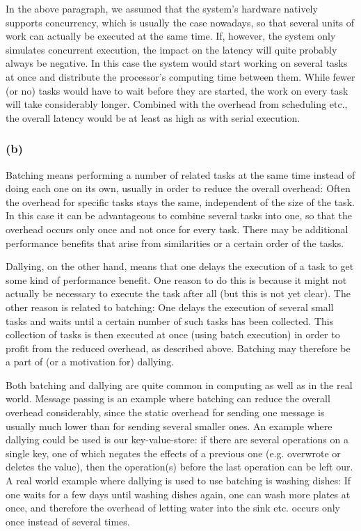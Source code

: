 \documentclass[12pt,a4paper]{article}
\begin{document}
In the above paragraph, we assumed that the system's hardware natively supports concurrency, which is usually the case nowadays, so that several units of work can actually be executed at the same time. If, however, the system only simulates concurrent execution, the impact on the latency will quite probably always be negative. In this case the system would start working on several tasks at once and distribute the processor's computing time between them. While fewer (or no) tasks would have to wait before they are started, the work on every task will take considerably longer. Combined with the overhead from scheduling etc., the overall latency would be at least as high as with serial execution.

\subsubsection*{(b)}
Batching means performing a number of related tasks at the same time instead of doing each one on its own, usually in order to reduce the overall overhead: Often the overhead for specific tasks stays the same, independent of the size of the task. In this case it can be advantageous to combine several tasks into one, so that the overhead occurs only once and not once for every task. There may be additional performance benefits that arise from similarities or a certain order of the tasks. 

Dallying, on the other hand, means that one delays the execution of a task to get some kind of performance benefit. One reason to do this is because it might not actually be necessary to execute the task after all (but this is not yet clear). The other reason is related to batching: One delays the execution of several small tasks and waits until a certain number of such tasks has been collected. This collection of tasks is then executed at once (using batch execution) in order to profit from the reduced overhead, as described above. Batching may therefore be a part of (or a motivation for) dallying.

Both batching and dallying are quite common in computing as well as in the real world. Message passing is an example where batching can reduce the overall overhead considerably, since the static overhead for sending one message is usually much lower than for sending several smaller ones. An example where dallying could be used is our key-value-store: if there are several operations on a single key, one of which negates the effects of a previous one (e.g. overwrote or deletes the value), then the operation(s) before the last operation can be left our. A real world example where dallying is used to use batching is washing dishes: If one waits for a few days until washing dishes again, one can wash more plates at once, and therefore the overhead of letting water into the sink etc. occurs only once instead of several times.
\end{document}
